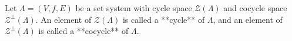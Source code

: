Let $\Lambda = (V, f, E)$ be a set system with cycle space $\mathcal{Z}(\Lambda)$ and cocycle space $\mathcal{Z}^\perp(\Lambda)$. An element of $\mathcal{Z}(\Lambda)$ is called a **cycle** of $\Lambda$, and an element of $\mathcal{Z}^\perp(\Lambda)$ is called a **cocycle** of $\Lambda$.
